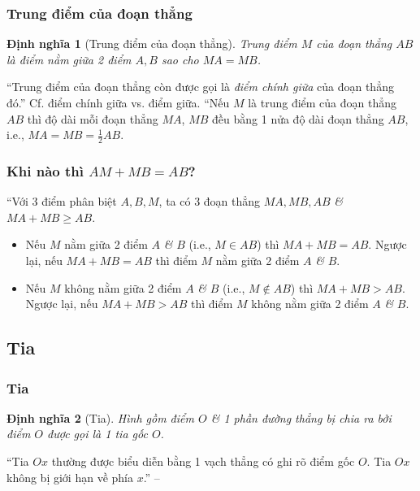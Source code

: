 \documentclass{article}
\numberwithin{equation}{section}
\newtheorem{dinhnghia}{Định nghĩa}[section]
\begin{document}
\subsubsection{Trung điểm của đoạn thẳng}

\begin{dinhnghia}[Trung điểm của đoạn thẳng]
	\emph{Trung điểm $M$} của đoạn thẳng $AB$ là điểm nằm giữa 2 điểm $A,B$ sao cho $MA = MB$.
\end{dinhnghia}
``Trung điểm của đoạn thẳng còn được gọi là \textit{điểm chính giữa} của đoạn thẳng đó.'' Cf. điểm chính giữa vs. điểm giữa. ``Nếu $M$ là trung điểm của đoạn thẳng $AB$ thì độ dài mỗi đoạn thẳng $MA$, $MB$ đều bằng 1 nửa độ dài đoạn thẳng $AB$, i.e., $MA = MB = \frac{1}{2}AB$.

\subsubsection{Khi nào thì $AM + MB = AB$?}
``Với 3 điểm phân biệt $A,B,M$, ta có 3 đoạn thẳng $MA,MB,AB$ \textit{\&} $MA + MB\ge AB$.
\begin{itemize}
	\item Nếu $M$ nằm giữa 2 điểm $A$ \textit{\&} $B$ (i.e., $M\in AB$) thì $MA + MB = AB$. Ngược lại, nếu $MA + MB = AB$ thì điểm $M$ nằm giữa 2 điểm $A$ \textit{\&} $B$.
	\item Nếu $M$ không nằm giữa 2 điểm $A$ \textit{\&} $B$ (i.e., $M\notin AB$) thì $MA + MB > AB$. Ngược lại, nếu $MA + MB > AB$ thì điểm $M$ không nằm giữa 2 điểm $A$ \textit{\&} $B$.
\end{itemize}


\subsection{Tia}

\subsubsection{Tia}

\begin{dinhnghia}[Tia]
	Hình gồm điểm $O$ \textit{\&} 1 phần đường thẳng bị chia ra bởi điểm $O$ được gọi là 1 \textit{tia gốc $O$}.
\end{dinhnghia}
``Tia $Ox$ thường được biểu diễn bằng 1 vạch thẳng có ghi rõ điểm gốc $O$. Tia $Ox$ không bị giới hạn về phía $x$.'' -- \cite[p. 89]{SGK_Toan_6_Canh_Dieu_tap_2}
\end{document}
